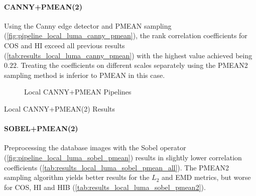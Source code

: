 \FloatBarrier
\paragraph{CANNY+PMEAN(2)}

Using the Canny edge detector and PMEAN sampling
(\autoref{fig:pipeline_local_luma_canny_pmean}), the rank correlation
coefficients for COS and HI exceed all previous results
(\autoref{tab:results_local_luma_canny_pmean}) with the highest value
achieved being $0.22$. Treating the coefficients on different scales separately
using the PMEAN2 sampling method is inferior to PMEAN in this case.

\begin{figure}[h]
    \centering
    
    \caption[Local CANNY+PMEAN Pipelines]{
        Local CANNY+PMEAN Pipelines
    }
    \label{fig:pipeline_local_luma_canny_pmean}
\end{figure}

\begin{table}[h]
    \centering
    \quad
    \caption[Local CANNY+PMEAN(2) Results]{
        Local CANNY+PMEAN(2) Results
    }
    \label{tab:results_local_luma_canny_pmean_all}
\end{table}

\FloatBarrier
\paragraph{SOBEL+PMEAN(2)}

Preprocessing the database images with the Sobel operator
(\autoref{fig:pipeline_local_luma_sobel_pmean}) results in slightly lower
correlation coefficients (\autoref{tab:results_local_luma_sobel_pmean_all}).
The PMEAN2 sampling algorithm yields better results for the $L_2$ and EMD
metrics, but worse for COS, HI and HIB
(\autoref{tab:results_local_luma_sobel_pmean2}).

